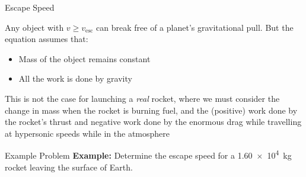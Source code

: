 \documentclass[12pt,compress,aspectratio=169]{beamer}
\begin{document}
\begin{frame}{Escape Speed}


  Any object with $v\geq v_\text{esc}$ can break free of a planet's
  gravitational pull. But the equation assumes that:
  \begin{itemize}
  \item Mass of the object remains constant
  \item All the work is done by gravity
  \end{itemize}
  This is not the case for launching a \emph{real} rocket, where we must
  consider the change in mass when the rocket is burning fuel, and the
  (positive) work done by the rocket's thrust and negative work done by the
  enormous drag while travelling at hypersonic speeds while in the atmosphere
\end{frame}



\begin{frame}{Example Problem}
  \textbf{Example:} Determine the escape speed for a \SI{1.60e4}{\kilo\gram}
  rocket leaving the surface of Earth.

\end{frame}



%  
\end{document}
